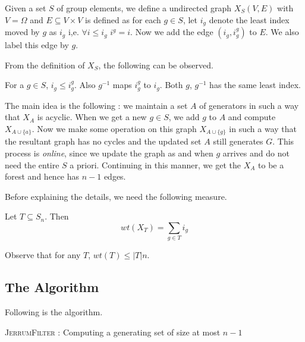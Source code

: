 Given a set $S$ of group elements, we define a undirected graph $X_S(V,E)$ with
$V= \Omega$ and $E \subseteq V \times V$ is defined as for each $g \in S$, let
$i_g$ denote the least index moved by $g$ as $i_g$ i,e.  $\forall i \le i_g$
$i^g = i$.  Now we add the edge $(i_g,i_g^g)$ to $E$. We also 
label this edge by $g$. 

From the definition of $X_S$, the following can be observed.
\begin{observation}
	For a $g \in S$, $i_g \le i_g^g$. Also $g^{-1}$ maps $i_g^g$ to $i_g$.
	Both $g$, $g^{-1}$ has the same least index. 
\end{observation}
The main idea is the following : we maintain a set $A$ of generators in such a
way that $X_A$ is acyclic. When we get a new $g \in S$, we add $g$ to $A$ and
compute $X_{A \cup \{a\}}$. Now we make some operation on this graph 
$X_{A \cup \{g\}}$ in such a way that the resultant graph has no cycles and
the updated set $A$ still generates $G$. This process is \emph{online},
since we update the graph as and when $g$ arrives and do not need the entire
$S$ a priori. Continuing in this manner, we get the $X_A$ to be a forest and
hence has $n-1$ edges.

Before explaining the details, we need the following measure.
\begin{definition}[Weight of $T$]
	Let $T \subseteq S_n$. Then \[ wt(X_T )=\sum_{g \in T} i_g \]
\end{definition}
Observe that for any $T$, $wt(T) \le |T|n$.

\newpage
\subsection{The Algorithm}
Following is the algorithm.
\begin{algorithm}[htp!]
\caption{\textsc{JerrumFilter} : Computing a generating set of size at most
$n-1$}
\label{alg:jerfilter}
\begin{algorithmic}[1] 
		\EndIf
	\EndFor
\EndProcedure
\end{algorithmic}
\end{algorithm}

